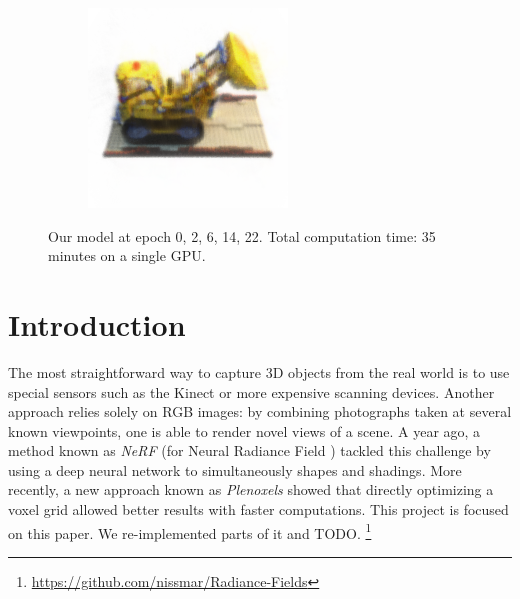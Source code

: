 \documentclass{article}
\begin{document}
\begin{figure}[!h]
\begin{subfigure}{.19\textwidth}
\end{subfigure}
\begin{subfigure}{.19\textwidth}
  \centering
  \includegraphics[width=\linewidth]{figs/model32.png}  
\end{subfigure}
     \caption{Our model at epoch {0, 2, 6, 14, 22}. Total computation time: 35 minutes on a single GPU.}
    \label{fig:lego_optim}
\end{figure}


\begin{abstract}

\cite{plenoxels}
\cite{nerf}
\cite{spacecarving}
\cite{directvoxgo}
\cite{instant}
\end{abstract}


\section{Introduction}

The most straightforward way to capture 3D objects from the real world is to use special sensors such as the Kinect or more expensive scanning devices. Another approach relies solely on RGB images: by combining photographs taken at several known viewpoints, one is able to render novel views of a scene. A year ago, a method known as \textit{NeRF} (for Neural Radiance Field \cite{nerf}) tackled this challenge by using a deep neural network to simultaneously shapes and shadings. More recently, a new approach known as \textit{Plenoxels} \cite{plenoxels} showed that directly optimizing a voxel grid allowed better results with faster computations. This project is focused on this paper. We re-implemented parts of it and TODO.
\footnote{\url{https://github.com/nissmar/Radiance-Fields}}
\end{document}
